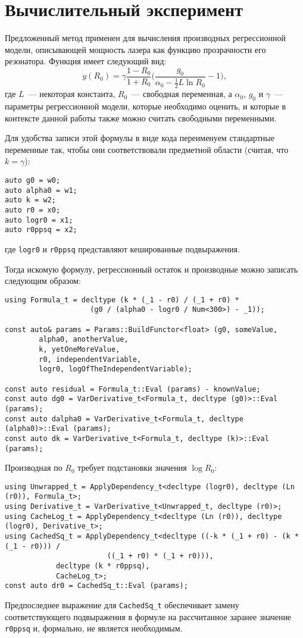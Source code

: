 \documentclass[11pt,a4paper]{article}
\begin{document}
\section{Вычислительный эксперимент}

Предложенный метод применен для вычисления производных регрессионной модели,
описывающей мощность лазера как функцию прозрачности его
резонатора\cite{Rudoy16StabilityAnalysis}.
Функция имеет следующий вид:
\[
  y(R_0) = \gamma \frac{1 - R_0}{1 + R_0} \Big(\frac{g_0}{\alpha_0 - \frac{1}{2} L \ln R_0} - 1\Big),
\]
где $L$~--- некоторая константа, $R_0$~--- свободная переменная, а $\alpha_0$, $g_0$ и
$\gamma$~--- параметры регрессионной модели, которые необходимо оценить, и которые
в контексте данной работы также можно считать свободными переменными.

Для удобства записи этой формулы в виде кода переименуем стандартные переменные так,
чтобы они соответствовали предметной области (считая, что $k = \gamma$):
\begin{lstlisting}
auto g0 = w0;
auto alpha0 = w1;
auto k = w2;
auto r0 = x0;
auto logr0 = x1;
auto r0ppsq = x2;
\end{lstlisting}
где \texttt{logr0} и \texttt{r0ppsq} представляют кешированные подвыражения.

Тогда искомую формулу, регрессионный остаток и производные можно записать следующим образом:
\begin{lstlisting}
using Formula_t = decltype (k * (_1 - r0) / (_1 + r0) *
					(g0 / (alpha0 - logr0 / Num<300>) - _1));

const auto& params = Params::BuildFunctor<float> (g0, someValue,
        alpha0, anotherValue,
        k, yetOneMoreValue,
        r0, independentVariable,
        logr0, logOfTheIndependentVariable);

const auto residual = Formula_t::Eval (params) - knownValue;
const auto dg0 = VarDerivative_t<Formula_t, decltype (g0)>::Eval (params);
const auto dalpha0 = VarDerivative_t<Formula_t, decltype (alpha0)>::Eval (params);
const auto dk = VarDerivative_t<Formula_t, decltype (k)>::Eval (params);
\end{lstlisting}

Производная по $R_0$ требует подстановки значения $\log R_0$:
\begin{lstlisting}
using Unwrapped_t = ApplyDependency_t<decltype (logr0), decltype (Ln (r0)), Formula_t>;
using Derivative_t = VarDerivative_t<Unwrapped_t, decltype (r0)>;
using CacheLog_t = ApplyDependency_t<decltype (Ln (r0)), decltype (logr0), Derivative_t>;
using CachedSq_t = ApplyDependency_t<decltype ((-k * (_1 + r0) - (k * (_1 - r0))) /
						((_1 + r0) * (_1 + r0))),
			decltype (k * r0ppsq),
			CacheLog_t>;
const auto dr0 = CachedSq_t::Eval (params);
\end{lstlisting}
Предпоследнее выражение для \texttt{CachedSq\_t} обеспечивает замену соответствующего
подвыражения в формуле на рассчитанное заранее значение \texttt{r0ppsq} и, формально,
не является необходимым.
\end{document}
